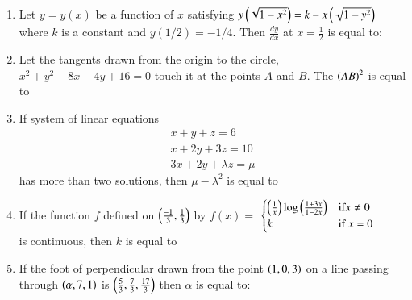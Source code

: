 \documentclass[journal,12pt,onecolumn]{IEEEtran}
\theoremstyle{remark}
\begin{document}
\begin{enumerate}
\item  Let $y = y(x)$ be a function of $x$ satisfying $y\left(\sqrt{1-x^2}\right)=k-x\left(\sqrt{1-y^2}\right)$ where $k$ is a constant and $y(1/2) = -1/4$. Then $\frac{dy}{dx}$ at $x=\frac{1}{2}$ is equal to:
\begin{enumerate}
\end{enumerate}


\item Let the tangents drawn from the origin to the circle, $x^2 + y^2 - 8x - 4y + 16 = 0$ touch it at the points $A$ and $B$. The $\left(AB\right)^2$ is equal to
\begin{enumerate}
\end{enumerate}

\item If system of linear equations \\
\begin{align*}
   x+y+z=6  \\
   x + 2y + 3z = 10 \\
   3x + 2y + \lambda z = \mu
\end{align*}
has more than two solutions, then $\mu - \lambda^2$ is equal to


\item If the function $f$ defined on $\left(\frac{-1}{3},\frac{1}{3}\right)$ by
    $f(x) = $
$\begin{cases}
   \left(\frac{1}{x}\right)\log\left(\frac{1+3x}{1-2x}\right)  & \text{if} x \neq 0\\
    k & \text{if} \  x=0
\end{cases}$\\ 
is continuous, then $k$ is equal to

\item If the foot of perpendicular drawn from the point $\left(1,0,3\right)$ on a line passing through $\left(\alpha,7,1\right)$ is $\left(\frac{5}{3},\frac{7}{3},\frac{17}{3}\right)$ then $\alpha$ is equal to:


\end{enumerate}
\end{document}
